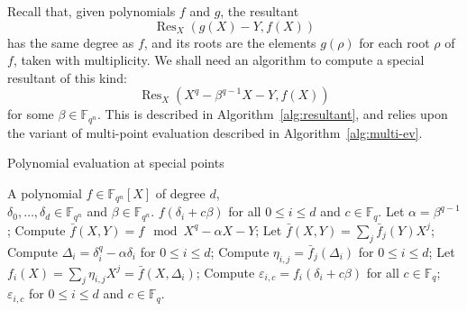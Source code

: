 \documentclass{sig-alternate}
\newcommand{\ff}[1]{\mathbb{F}_{#1}}
\newcommand{\dd}{d}
\newcommand{\qq}{q}
\newcommand{\nn}{n}
\newcommand{\qn}{{\qq^\nn}}
\newcommand{\basef}{\ff{\qq}}
\newcommand{\extf}{\ff{\qn}}
\DeclareMathOperator{\Res}{Res}
\newcounter{algo}
\begin{document}
Recall that, given polynomials $f$ and $g$, the resultant
$$\Res_X(g(X)-Y,f(X))$$
has the same degree as $f$, and its roots are the elements $g(\rho)$
for each root $\rho$ of $f$, taken with multiplicity. We shall need an
algorithm to compute a special resultant of this kind:
$$\Res_X(X^\qq-\beta^{\qq-1}X-Y,f(X))$$
for some $\beta\in\extf$. This is described in
Algorithm~\ref{alg:resultant}, and relies upon the variant of
multi-point evaluation described in Algorithm~\ref{alg:multi-ev}.



\begin{algorithm}
  \caption{Polynomial evaluation at special points}
  \label{alg:multi-ev}
  \begin{algorithmic}[1]
    \REQUIRE A polynomial $f\in\extf[X]$ of degree $\dd$,\\
    $\delta_0,\dots,\delta_\dd\in\extf$ and $\beta\in\extf$.
    \ENSURE $f(\delta_i+c\beta)$ for all $0\le i \le \dd$ and $c\in\basef$.
    \STATE Let $\alpha = \beta^{\qq-1}$;
    \STATE\label{alg:multi-ev:mod} Compute $\bar{f}(X,Y) = f \mod X^\qq-\alpha X-Y$;
    \STATE Let $\bar{f}(X,Y) = \sum_j \bar{f}_j(Y)X^j$;
    \STATE\label{alg:multi-ev:Delta} Compute $\Delta_i=\delta_i^\qq-\alpha\delta_i$ for $0\le i\le\dd$;
    \FOR {$0\le j<\qq$}
    \STATE\label{alg:multi-ev:multi-ev} Compute $\eta_{i,j}=\bar{f}_j(\Delta_i)$ for $0\le i\le\dd$;
    \ENDFOR
    \STATE Let $f_i(X) = \sum_j \eta_{i,j}X^j=\bar{f}(X,\Delta_i)$;
    \FOR {$0\le i \le\dd$}
    \STATE\label{alg:multi-ev:final-ev} Compute $\varepsilon_{i,c}=f_i(\delta_i+c\beta)$ for all $c\in\basef$;
    \ENDFOR
    \RETURN $\varepsilon_{i,c}$ for $0\le i\le\dd$ and $c\in\basef$.
  \end{algorithmic}
\end{algorithm}
\end{document}

